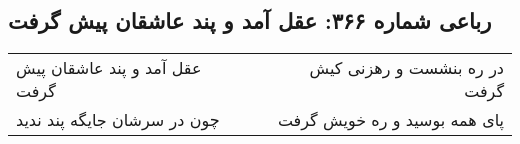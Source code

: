 \begin{center}
\section*{رباعی شماره ۳۶۶: عقل آمد و پند عاشقان پیش گرفت}
\label{sec:0366}
\begin{longtable}{l p{0.5cm} r}
عقل آمد و پند عاشقان پیش گرفت
&&
در ره بنشست و رهزنی کیش گرفت
\\
چون در سرشان جایگه پند ندید
&&
پای همه بوسید و ره خویش گرفت
\\
\end{longtable}
\end{center}
